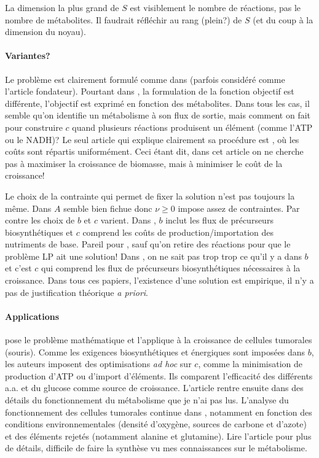 \begin{rem}
La dimension la plus grand de $S$ est visiblement le nombre de réactions, pas le nombre de métabolites. Il faudrait réfléchir au rang (plein?) de $S$ (et du coup à la dimension du noyau).
\end{rem}


\paragraph{Variantes?} Le problème est clairement formulé comme \citet{goelzer_cell_2011} dans \citet{fell_fat_1986} (parfois considéré comme l'article fondateur). Pourtant dans \citet{varma_metabolic_1993-1, varma_stoichiometric_1994}, la formulation de la fonction objectif est différente, l'objectif est exprimé en fonction des métabolites. Dans tous les cas, il semble qu'on identifie un métabolisme à son flux de sortie, mais comment on fait pour construire $c$ quand plusieurs réactions produisent un élément (comme l'ATP ou le NADH)? Le seul article qui explique clairement sa procédure est \citet{savinell_network_1992}, où les coûts sont répartis uniformément. Ceci étant dit, dans cet article on ne cherche pas à maximiser la croissance de biomasse, mais à minimiser le coût de la croissance!

Le choix de la contrainte qui permet de fixer la solution n'est pas toujours la même. Dans \citet{savinell_network_1992, varma_metabolic_1993, varma_metabolic_1993-1} $A$ semble bien fichue donc $\nu \geq 0$ impose assez de contraintes. Par contre les choix de $b$ et $c$ varient. Dans \citet{savinell_network_1992}, $b$ inclut les flux de précurseurs biosynthétiques et $c$ comprend les coûts de production/importation des nutriments de base. Pareil pour \citet{savinell_network_1992-1}, sauf qu'on retire des réactions pour que le problème LP ait une solution! Dans \citet{varma_metabolic_1993-1}, on ne sait pas trop trop ce qu'il y a dans $b$ et c'est $c$ qui comprend les flux de précurseurs biosynthétiques nécessaires à la croissance. Dans tous ces papiers, l'existence d'une solution est empirique, il n'y a pas de justification théorique \textit{a priori}.

\paragraph{Applications} \citet{savinell_network_1992} pose le problème mathématique et l'applique à la croissance de cellules tumorales (souris). Comme les exigences biosynthétiques et énergiques sont imposées dans $b$, les auteurs imposent des optimisations \textit{ad hoc} sur $c$, comme la minimisation de production d'ATP ou d'import d'éléments. Ils comparent l'efficacité des différents a.a. et du glucose comme source de croissance. L'article rentre ensuite dans des détails du fonctionnement du métabolisme que je n'ai pas lus. L'analyse du fonctionnement des cellules tumorales continue dans \citet{savinell_network_1992-1}, notamment en fonction des conditions environnementales (densité d'oxygène, sources de carbone et d'azote) et des éléments rejetés (notamment alanine et glutamine). Lire l'article pour plus de détails, difficile de faire la synthèse vu mes connaissances sur le métabolisme.

